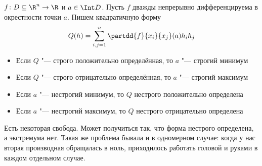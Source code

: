 \begin{theorem}
	$f \colon D \subseteq \R^n \to \R$ и $a \in \Int D$.
	Пусть $f$ дважды непрерывно дифференцируема в окрестности точки $a$.
	Пишем квадратичную форму
	\[
		Q(h) = \sum_{i,j=1}^n \partdd{f}{x_i}{x_j} (a) h_i h_j
	\]
	\begin{itemize}
	\item Если $Q$ "--- строго положительно определённая, то $a$ "--- строгий минимум
	\item Если $Q$ "--- строго отрицательно определённая, то $a$ "--- строгий максимум
	\item Если $a$ "--- нестрогий минимум, то $Q$ нестрого положительно определена
	\item Если $a$ "--- нестрогий максимум, то $Q$ нестрого отрицательно определена
	\end{itemize}
\end{theorem}
\begin{Rem}
	Есть некоторая свобода.
	Может получиться так, что форма нестрого определена, а экстремума нет.
	Такая же проблема бывала и в одномерном случае: когда у нас вторая производная обращалась в ноль,
	приходилось работать головой и руками в каждом отдельном случае.
\end{Rem}
